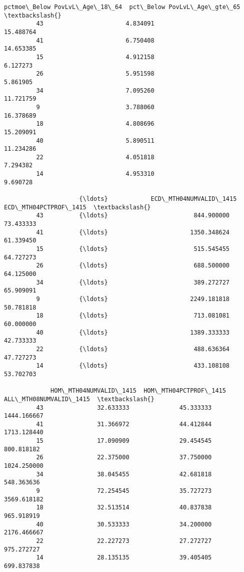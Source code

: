 \documentclass[11pt]{article}
\begin{document}
\begin{Verbatim}[commandchars=\\\{\}]
             pctmoe\_Below PovLvL\_Age\_18\_64  pct\_Below PovLvL\_Age\_gte\_65  \textbackslash{}
         43                       4.834091                    15.488764   
         41                       6.750408                    14.653385   
         15                       4.912158                     6.127273   
         26                       5.951598                     5.861905   
         34                       7.095260                    11.721759   
         9                        3.788060                    16.378689   
         18                       4.808696                    15.209091   
         40                       5.890511                    11.234286   
         22                       4.051818                     7.294382   
         14                       4.953310                     9.690728   
         
                     {\ldots}            ECD\_MTH04NUMVALID\_1415  ECD\_MTH04PCTPROF\_1415  \textbackslash{}
         43          {\ldots}                        844.900000              73.433333   
         41          {\ldots}                       1350.348624              61.339450   
         15          {\ldots}                        515.545455              64.727273   
         26          {\ldots}                        688.500000              64.125000   
         34          {\ldots}                        389.272727              65.909091   
         9           {\ldots}                       2249.181818              50.781818   
         18          {\ldots}                        713.081081              60.000000   
         40          {\ldots}                       1389.333333              42.733333   
         22          {\ldots}                        488.636364              47.727273   
         14          {\ldots}                        433.108108              53.702703   
         
             HOM\_MTH04NUMVALID\_1415  HOM\_MTH04PCTPROF\_1415  ALL\_MTH08NUMVALID\_1415  \textbackslash{}
         43               32.633333              45.333333             1444.166667   
         41               31.366972              44.412844             1713.128440   
         15               17.090909              29.454545              800.818182   
         26               22.375000              37.750000             1024.250000   
         34               38.045455              42.681818              548.363636   
         9                72.254545              35.727273             3569.618182   
         18               32.513514              40.837838              965.918919   
         40               30.533333              34.200000             2176.466667   
         22               22.227273              27.272727              975.272727   
         14               28.135135              39.405405              699.837838   
         

\end{Verbatim}
\end{document}
